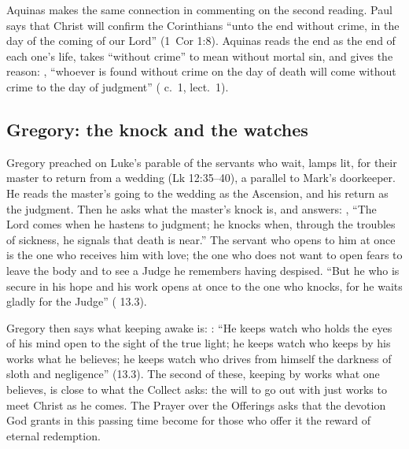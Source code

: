 Aquinas makes the same connection in commenting on the second reading. Paul
says that Christ will confirm the Corinthians ``unto the end without crime,
in the day of the coming of our Lord'' (1~Cor 1:8). Aquinas reads the end as
the end of each one's life, takes ``without crime'' to mean without mortal
sin, and gives the reason: , ``whoever is found without crime on
the day of death will come without crime to the day of judgment''
( c.~1, lect.~1).

\subsection{Gregory: the knock and the watches}

Gregory preached on Luke's parable of the servants who wait, lamps lit, for
their master to return from a wedding (Lk 12:35--40), a parallel to Mark's
doorkeeper. He reads the master's going to the wedding as the Ascension, and
his return as the judgment. Then he asks what the master's knock is, and
answers: , ``The Lord
comes when he hastens to judgment; he knocks when, through the troubles of
sickness, he signals that death is near.'' The servant who opens to him at
once is the one who receives him with love; the one who does not want to
open fears to leave the body and to see a Judge he remembers having despised.
``But he who is secure in his hope and his work opens at once to the one who
knocks, for he waits gladly for the Judge'' (
13.3).

Gregory then says what keeping awake is: : ``He keeps
watch who holds the eyes of his mind open to the sight of the true light; he
keeps watch who keeps by his works what he believes; he keeps watch who
drives from himself the darkness of sloth and negligence'' (13.3). The
second of these, keeping by works what one believes, is close to what the
Collect asks: the will to go out with just works to meet Christ as he comes.
The Prayer over the Offerings asks that the devotion God grants in this
passing time become for those who offer it the reward of eternal redemption.

